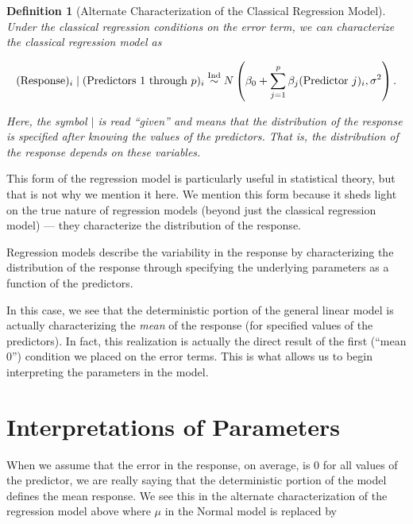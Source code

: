 \documentclass[
]{book}
\theoremstyle{plain}
\theoremstyle{mydefn}
\newtheorem{definition}{Definition}[chapter]
\theoremstyle{myexmpl}
\theoremstyle{remark}
\begin{document}
\begin{definition}[Alternate Characterization of the Classical Regression Model]
\protect\hypertarget{def:defn-alternate-characterization}{}{\label{def:defn-alternate-characterization} {} }Under the classical regression conditions on the error term, we can characterize the classical regression model as

\[(\text{Response})_i \mid (\text{Predictors 1 through } p)_i \stackrel{\text{Ind}}{\sim} N\left(\beta_0 + \sum\limits_{j=1}^{p} \beta_j (\text{Predictor } j)_i, \sigma^2\right).\]

Here, the symbol \(\mid\) is read ``given'' and means that the distribution of the response is specified after knowing the values of the predictors. That is, the distribution of the response depends on these variables.
\end{definition}

This form of the regression model is particularly useful in statistical theory, but that is not why we mention it here. We mention this form because it sheds light on the true nature of regression models (beyond just the classical regression model) --- they characterize the distribution of the response.

\begin{rmdkeyidea}
Regression models describe the variability in the response by characterizing the distribution of the response through specifying the underlying parameters as a function of the predictors.
\end{rmdkeyidea}

In this case, we see that the deterministic portion of the general linear model is actually characterizing the \emph{mean} of the response (for specified values of the predictors). In fact, this realization is actually the direct result of the first (``mean 0'') condition we placed on the error terms. This is what allows us to begin interpreting the parameters in the model.

\hypertarget{interpretations-of-parameters}{%
\section{Interpretations of Parameters}\label{interpretations-of-parameters}}

When we assume that the error in the response, on average, is 0 for all values of the predictor, we are really saying that the deterministic portion of the model defines the mean response. We see this in the alternate characterization of the regression model above where \(\mu\) in the Normal model is replaced by
\end{document}
